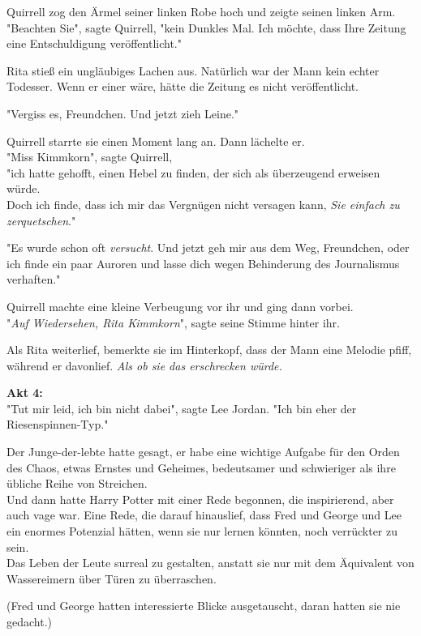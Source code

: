 {Quirrell zog den Ärmel seiner linken Robe hoch und zeigte seinen linken Arm.\\ "Beachten Sie", sagte Quirrell, "kein Dunkles Mal. Ich möchte, dass Ihre Zeitung eine Entschuldigung veröffentlicht."

Rita stieß ein ungläubiges Lachen aus. Natürlich war der Mann kein echter Todesser. Wenn er einer wäre, hätte die Zeitung es nicht veröffentlicht.

"Vergiss es, Freundchen. Und jetzt zieh Leine."

Quirrell starrte sie einen Moment lang an. Dann lächelte er.\\ "Miss Kimmkorn", sagte Quirrell,\\ "ich hatte gehofft, einen Hebel zu finden, der sich als überzeugend erweisen würde.\\ Doch ich finde, dass ich mir das Vergnügen nicht versagen kann, \emph{Sie einfach zu zerquetschen}."

"Es wurde schon oft \emph{versucht}. Und jetzt geh mir aus dem Weg, Freundchen, oder ich finde ein paar Auroren und lasse dich wegen Behinderung des Journalismus verhaften."

Quirrell machte eine kleine Verbeugung vor ihr und ging dann vorbei.\\ "\emph{Auf Wiedersehen, Rita Kimmkorn}", sagte seine Stimme hinter ihr.

Als Rita weiterlief, bemerkte sie im Hinterkopf, dass der Mann eine Melodie pfiff, während er davonlief. \emph{Als ob sie das erschrecken würde.}

\textbf{Akt 4:}\\ "Tut mir leid, ich bin nicht dabei", sagte Lee Jordan. "Ich bin eher der Riesenspinnen-Typ."

Der Junge-der-lebte hatte gesagt, er habe eine wichtige Aufgabe für den Orden des Chaos, etwas Ernstes und Geheimes, bedeutsamer und schwieriger als ihre übliche Reihe von Streichen.\\ Und dann hatte Harry Potter mit einer Rede begonnen, die inspirierend, aber auch vage war. Eine Rede, die darauf hinauslief, dass Fred und George und Lee ein enormes Potenzial hätten, wenn sie nur lernen könnten, noch verrückter zu sein.\\ Das Leben der Leute surreal zu gestalten, anstatt sie nur mit dem Äquivalent von Wassereimern über Türen zu überraschen.

(Fred und George hatten interessierte Blicke ausgetauscht, daran hatten sie nie gedacht.)

}
